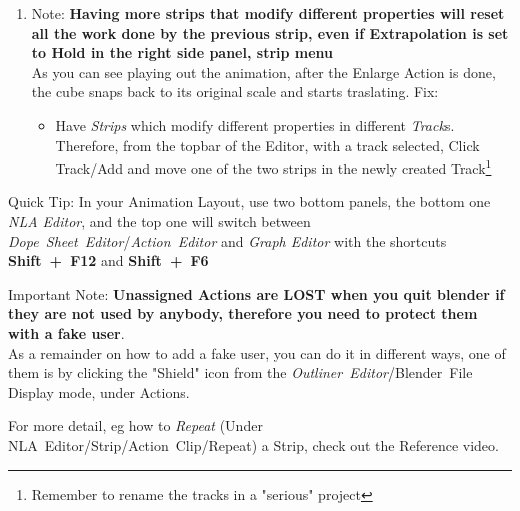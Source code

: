 \documentclass{article}
\begin{document}
\begin{mdframed}[linewidth=2pt, linecolor=gray, roundcorner=1pt, innermargin=2pt, outermargin=2pt]
\begin{enumerate}[topsep=0pt, noitemsep]
\begin{center}
        \end{center}
        \item Note: \textbf{Having more strips that modify different properties will reset all the work done by the previous strip, even if Extrapolation is set to Hold in the right side panel, strip menu}\\
            As you can see playing out the animation, after the Enlarge Action is done, the cube snaps back to its original scale and starts traslating. Fix:
            \begin{itemize}[noitemsep, topsep=0pt]
                \item Have \textit{Strips} which modify different properties in different \textit{Track}s. Therefore, from the topbar of the Editor, with a track selected, Click \mbox{Track/Add} and 
                    move one of the two strips in the newly created Track\footnote{Remember to rename the tracks in a "serious" project}
            \end{itemize}
    \end{enumerate}
    {\tiny Quick Tip: In your Animation Layout, use two bottom panels, the bottom one \textit{NLA Editor}, and the top one will switch between \mbox{\textit{Dope Sheet Editor}/\textit{Action Editor}}
      and \textit{Graph Editor} with the shortcuts \mbox{\textbf{Shift + F12}} and \mbox{\textbf{Shift + F6}}
    }
\end{mdframed}
Important Note: \textbf{Unassigned Actions are LOST when you quit blender if they are not used by anybody, therefore you need to protect them with a fake user}.\\
As a remainder on how to add a fake user, you can do it in different ways, one of them is by clicking the "Shield" icon from the \mbox{\textit{Outliner Editor}/Blender File} Display mode, under Actions.\par
For more detail, eg how to \textit{Repeat} (Under \mbox{NLA Editor/Strip/Action Clip/Repeat}) a Strip, check out the Reference video.
\end{document}
